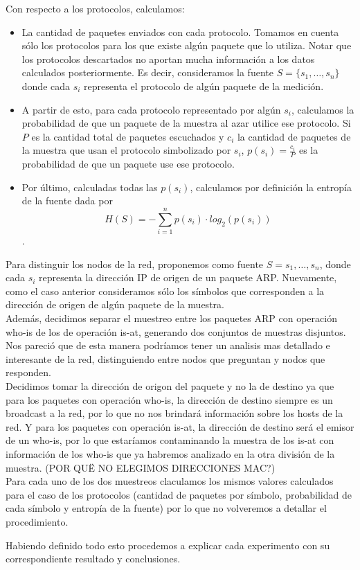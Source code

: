 Con respecto a los protocolos, calculamos:
\begin{itemize}
\item La cantidad de paquetes enviados con cada protocolo. Tomamos en cuenta sólo los protocolos para los que existe algún paquete que lo utiliza. Notar que los protocolos descartados no aportan mucha información a los datos calculados posteriormente. Es decir, consideramos la fuente $S = \{ s_1, \ldots, s_n \}$ donde cada $s_i$ representa el protocolo de algún paquete de la medición.
\item A partir de esto, para cada protocolo representado por algún $s_i$, calculamos la probabilidad de que un paquete de la muestra al azar utilice ese protocolo. Si $P$ es la cantidad total de paquetes escuchados y $c_i$ la cantidad de paquetes de la muestra que usan el protocolo simbolizado por $s_i$, $p(s_i) = \frac{c_i}{P}$ es la probabilidad de que un paquete use ese protocolo.
\item Por último, calculadas todas las $p(s_i)$, calculamos por definición la entropía de la fuente dada por $$H(S) = - \sum_{i=1}^{n} p(s_i) \cdot log_2(p(s_i))$$.
\end{itemize}
\bigskip
Para distinguir los nodos de la red, proponemos como fuente $S = {s_1, \ldots, s_n}$, donde cada $s_i$ representa la dirección IP de origen de un paquete ARP. Nuevamente, como el caso anterior consideramos sólo los símbolos que corresponden a la dirección de origen de algún paquete de la muestra.\\
Además, decidimos separar el muestreo entre los paquetes ARP con operación who-is de los de operación is-at, generando dos conjuntos de muestras disjuntos. Nos pareció que de esta manera podríamos tener un analisis mas detallado e interesante de la red, distinguiendo entre nodos que preguntan y nodos que responden.\\
Decidimos tomar la dirección de origon del paquete y no la de destino ya que para los paquetes con operación who-is, la dirección de destino siempre es un broadcast a la red, por lo que no nos brindará información sobre los hosts de la red. Y para los paquetes con operación is-at, la dirección de destino será el emisor de un who-is, por lo que estaríamos contaminando la muestra de los is-at con información de los who-is que ya habremos analizado en la otra división de la muestra. (POR QUË NO ELEGIMOS DIRECCIONES MAC?)\\
Para cada uno de los dos muestreos claculamos los mismos valores calculados para el caso de los protocolos (cantidad de paquetes por símbolo, probabilidad de cada símbolo y entropía de la fuente) por lo que no volveremos a detallar el procedimiento.\bigskip

Habiendo definido todo esto procedemos a explicar cada experimento con su correspondiente resultado y conclusiones. 
